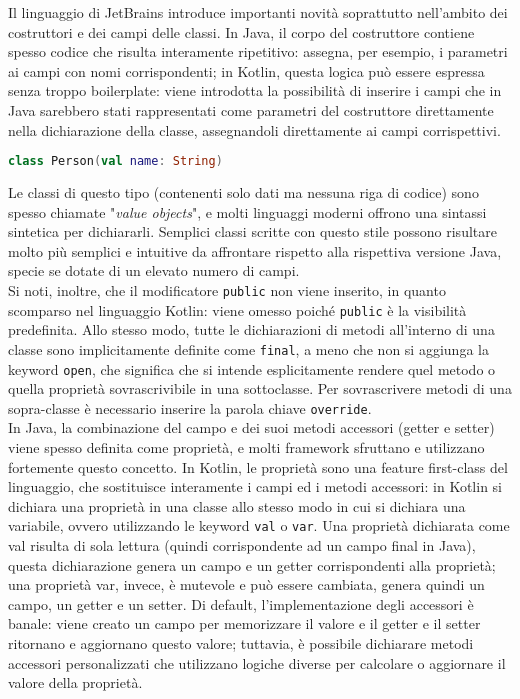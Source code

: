 Il linguaggio di JetBrains introduce importanti novità soprattutto nell’ambito dei costruttori e dei campi delle classi. In Java, il corpo del costruttore contiene spesso codice che risulta interamente ripetitivo: assegna, per esempio, i parametri ai campi con nomi corrispondenti; in Kotlin, questa logica può essere espressa senza troppo boilerplate: viene introdotta la possibilità di inserire i campi che in Java sarebbero stati rappresentati come parametri del costruttore direttamente nella dichiarazione della classe, assegnandoli direttamente ai campi corrispettivi.\\

\begin{lstlisting}[caption={Classe \texttt{Person} con una proprietà \texttt{name}}, captionpos=b, label={lst:exampleClassDeclaration}, language=Kotlin]
class Person(val name: String)
\end{lstlisting}

Le classi di questo tipo (contenenti solo dati ma nessuna riga di codice) sono spesso
chiamate "{\em value objects}", e molti linguaggi moderni offrono una sintassi sintetica per dichiararli.
Semplici classi scritte con questo stile possono risultare molto più semplici e intuitive da affrontare rispetto alla rispettiva versione Java, specie se dotate di un elevato numero di campi.\\
Si noti, inoltre, che il modificatore \texttt{public} non viene inserito, in quanto scomparso nel linguaggio Kotlin: viene omesso poiché \texttt{public} è la visibilità predefinita. Allo stesso modo, tutte le dichiarazioni di metodi all’interno di una classe sono implicitamente definite come \texttt{final}, a meno che non si aggiunga la keyword \texttt{open}, che significa che si intende esplicitamente rendere quel metodo o quella proprietà sovrascrivibile in una sottoclasse. Per sovrascrivere metodi di una sopra-classe è necessario inserire la parola chiave \texttt{override}.\\

In Java, la combinazione del campo e dei suoi metodi accessori (getter e setter) viene spesso definita come proprietà, e molti framework sfruttano e utilizzano fortemente questo concetto. In Kotlin, le proprietà sono una feature first-class del linguaggio, che sostituisce interamente i campi ed i metodi accessori: in Kotlin si dichiara una proprietà in una classe allo stesso modo in cui si dichiara una variabile, ovvero utilizzando le keyword \texttt{val} o \texttt{var}. Una proprietà dichiarata come val risulta di sola lettura (quindi corrispondente ad un campo final in Java), questa dichiarazione genera un campo e un getter corrispondenti alla proprietà; una proprietà var, invece, è mutevole e può essere cambiata, genera quindi un campo, un getter e un setter. Di default, l'implementazione degli accessori è banale: viene creato un campo per memorizzare il valore e il getter e il setter ritornano e aggiornano questo valore; tuttavia, è possibile dichiarare metodi accessori personalizzati che utilizzano logiche diverse per calcolare o aggiornare il valore della proprietà.\\

